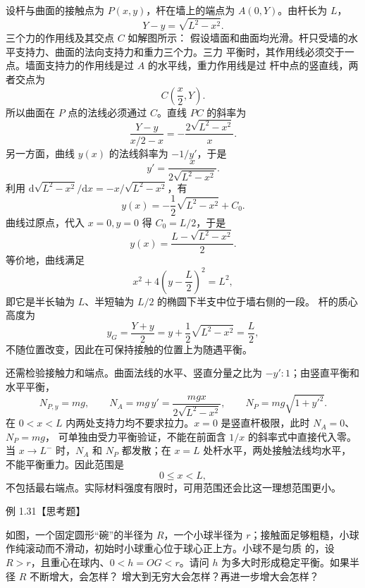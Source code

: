 \begin{xesolution}
设杆与曲面的接触点为 $P(x,y)$，杆在墙上的端点为 $A(0,Y)$。由杆长为 $L$，
\[
  Y-y=\sqrt{L^2-x^2}.
\]
三个力的作用线及其交点 $C$ 如解图所示：
\soldiagOneThirty
假设墙面和曲面均光滑。杆只受墙的水平支持力、曲面的法向支持力和重力三个力。三力
平衡时，其作用线必须交于一点。墙面支持力的作用线是过 $A$ 的水平线，重力作用线是过
杆中点的竖直线，两者交点为
\[
  C\left(\frac x2,Y\right).
\]
所以曲面在 $P$ 点的法线必须通过 $C$。直线 $PC$ 的斜率为
\[
  \frac{Y-y}{x/2-x}=-\frac{2\sqrt{L^2-x^2}}{x}.
\]
另一方面，曲线 $y(x)$ 的法线斜率为 $-1/y'$，于是
\[
  y'=\frac{x}{2\sqrt{L^2-x^2}}.
\]
利用 $\mathrm d\sqrt{L^2-x^2}/\mathrm dx=-x/\sqrt{L^2-x^2}$，有
\[
 y(x)=-\frac12\sqrt{L^2-x^2}+C_0.
\]
曲线过原点，代入 $x=0,y=0$ 得 $C_0=L/2$，于是
\[
  \boxed{y(x)=\frac{L-\sqrt{L^2-x^2}}{2}}.
\]
等价地，曲线满足
\[
  \boxed{x^2+4\left(y-\frac L2\right)^2=L^2},
\]
即它是半长轴为 $L$、半短轴为 $L/2$ 的椭圆下半支中位于墙右侧的一段。
杆的质心高度为
\[
 y_G=\frac{Y+y}{2}=y+\frac12\sqrt{L^2-x^2}=\frac L2,
\]
不随位置改变，因此在可保持接触的位置上为随遇平衡。

还需检验接触力和端点。曲面法线的水平、竖直分量之比为 $-y':1$；由竖直平衡和水平平衡，
\[
 N_{P,y}=mg,\qquad
 N_A=mg\,y'=\frac{mgx}{2\sqrt{L^2-x^2}},\qquad
 N_P=mg\sqrt{1+y'^2}.
\]
在 $0<x<L$ 内两处支持力均不要求拉力。$x=0$ 是竖直杆极限，此时 $N_A=0$、$N_P=mg$，
可单独由受力平衡验证，不能在前面含 $1/x$ 的斜率式中直接代入零。
当 $x\to L^-$ 时，$N_A$ 和 $N_P$ 都发散；在 $x=L$ 处杆水平，两处接触法线均水平，
不能平衡重力。因此范围是
\[
 \boxed{0\le x<L},
\]
不包括最右端点。实际材料强度有限时，可用范围还会比这一理想范围更小。
\end{xesolution}

\begin{origexamplebox}{例 1.31【思考题】}
\begin{minipage}[t]{0.62\linewidth}
如图，一个固定圆形“碗”的半径为 $R$，一个小球半径为 $r$；接触面足够粗糙，小球
作纯滚动而不滑动，初始时小球重心位于球心正上方。小球不是匀质
的，设 $R>r$，且重心在球内、$0<h=OG<r$。请问 $h$ 为多大时形成稳定平衡。如果半径 $R$ 不断增大，会怎样？
增大到无穷大会怎样？再进一步增大会怎样？
\end{minipage}\hfill
\begin{minipage}[t]{0.34\linewidth}
\vspace{0pt}\centering
\resizebox{\linewidth}{!}{\faithfulExOneThirtyOne}
\end{minipage}
\end{origexamplebox}

